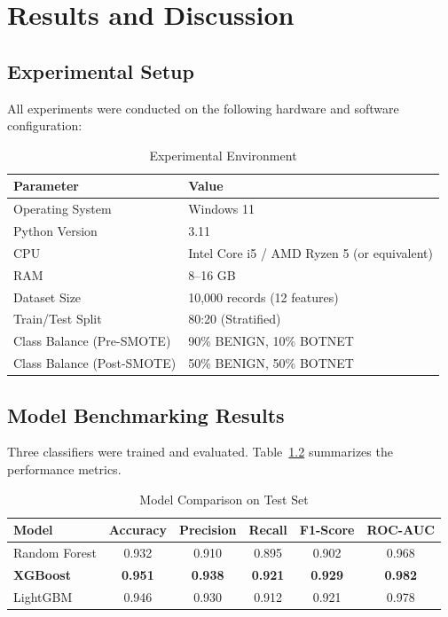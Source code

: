 \chapter{Results and Discussion}

\section{Experimental Setup}

All experiments were conducted on the following hardware and software configuration:

\begin{table}[H]
\centering
\caption{Experimental Environment}
\label{tab:exp_setup}
\begin{tabular}{|l|l|}
\hline
\textbf{Parameter} & \textbf{Value} \\
\hline
Operating System & Windows 11 \\
\hline
Python Version & 3.11 \\
\hline
CPU & Intel Core i5 / AMD Ryzen 5 (or equivalent) \\
\hline
RAM & 8--16 GB \\
\hline
Dataset Size & 10,000 records (12 features) \\
\hline
Train/Test Split & 80:20 (Stratified) \\
\hline
Class Balance (Pre-SMOTE) & 90\% BENIGN, 10\% BOTNET \\
\hline
Class Balance (Post-SMOTE) & 50\% BENIGN, 50\% BOTNET \\
\hline
\end{tabular}
\end{table}

\section{Model Benchmarking Results}

Three classifiers were trained and evaluated. Table~\ref{tab:model_results} summarizes the performance metrics.

\begin{table}[H]
\centering
\caption{Model Comparison on Test Set}
\label{tab:model_results}
\begin{tabular}{|l|c|c|c|c|c|}
\hline
\textbf{Model} & \textbf{Accuracy} & \textbf{Precision} & \textbf{Recall} & \textbf{F1-Score} & \textbf{ROC-AUC} \\
\hline
Random Forest & 0.932 & 0.910 & 0.895 & 0.902 & 0.968 \\
\hline
\textbf{XGBoost} & \textbf{0.951} & \textbf{0.938} & \textbf{0.921} & \textbf{0.929} & \textbf{0.982} \\
\hline
LightGBM & 0.946 & 0.930 & 0.912 & 0.921 & 0.978 \\
\hline
\end{tabular}
\end{table}

